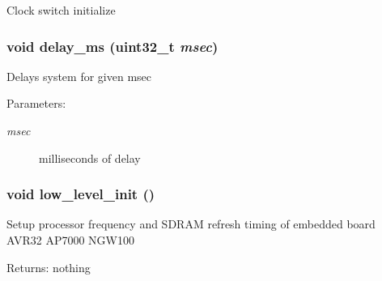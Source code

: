 Clock switch initialize \hypertarget{group___i_n_i_t_g0a52093f3e803fcb07aeb961756c9961}{
\subsubsection[{delay\_\-ms}]{\setlength{\rightskip}{0pt plus 5cm}void delay\_\-ms (uint32\_\-t {\em msec})}}
\label{group___i_n_i_t_g0a52093f3e803fcb07aeb961756c9961}


Delays system for given msec \begin{Desc}
\item[Parameters:]
\begin{description}
\item[{\em msec}]milliseconds of delay \end{description}
\end{Desc}
\hypertarget{group___i_n_i_t_gb5cd55a9a8526924bbc0f65b024972ad}{
\subsubsection[{low\_\-level\_\-init}]{\setlength{\rightskip}{0pt plus 5cm}void low\_\-level\_\-init ()}}
\label{group___i_n_i_t_gb5cd55a9a8526924bbc0f65b024972ad}


Setup processor frequency and SDRAM refresh timing of embedded board AVR32 AP7000 NGW100 \begin{Desc}
\item[Returns:]nothing \end{Desc}
